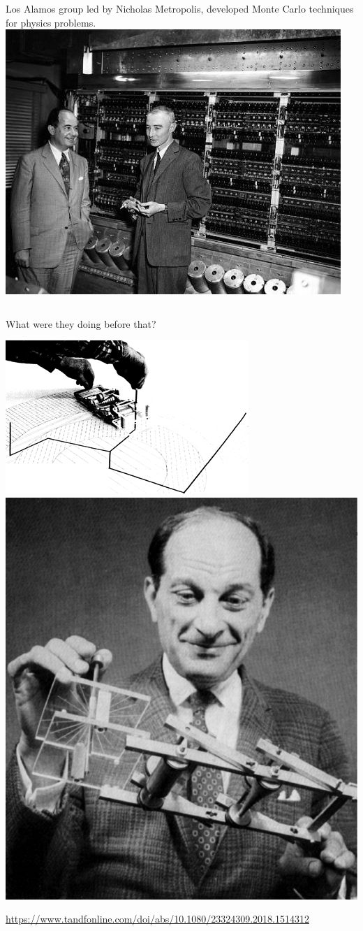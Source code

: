 \documentclass[aspectratio=169]{beamer}
\begin{document}
\begin{frame}{}
\begin{columns}
\vspace{0.25 cm}
Los Alamos group led by Nicholas Metropolis, developed Monte Carlo techniques for physics problems.
\includegraphics[width=\linewidth]{neumann_oppie.jpg}
\end{columns}
\end{frame}

\begin{frame}{What were they doing before that?}
\begin{center}
\includegraphics[height=5.5 cm]{FERMIAC.jpg}\hspace{0.25 cm}\includegraphics[height=5.5 cm]{STAN_ULAM_HOLDING_THE_FERMIAC.jpg}
\end{center}

\small
\vspace{0.5 cm}
\textcolor{blue}{\url{https://www.tandfonline.com/doi/abs/10.1080/23324309.2018.1514312}}

\end{frame}
\end{document}
